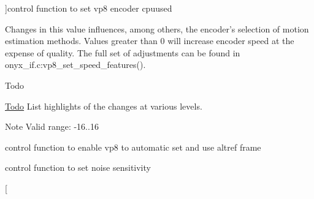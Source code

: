 \begin{Desc}
\begin{description}
{}]control function to set vp8 encoder cpuused \begin{DoxyVerb}   Changes in this value influences, among others, the encoder's selection
   of motion estimation methods. Values greater than 0 will increase encoder
   speed at the expense of quality.
   The full set of adjustments can be found in
   onyx_if.c:vp8_set_speed_features().
\end{DoxyVerb}
 \begin{DoxyRefDesc}{Todo}
\item[\hyperlink{todo__todo000001}{Todo}]List highlights of the changes at various levels.\end{DoxyRefDesc}


\begin{DoxyNote}{Note}
Valid range\-: -\/16..16 
\end{DoxyNote}
\item[{\em 
\hypertarget{group__vp8__encoder_gga6deae3d561c838952552c3d3756322eca24a5530efabb8b4949d01622b1d72cb0}{V\-P8\-E\-\_\-\-S\-E\-T\-\_\-\-E\-N\-A\-B\-L\-E\-A\-U\-T\-O\-A\-L\-T\-R\-E\-F}\label{group__vp8__encoder_gga6deae3d561c838952552c3d3756322eca24a5530efabb8b4949d01622b1d72cb0}
}]control function to enable vp8 to automatic set and use altref frame \item[{\em 
\hypertarget{group__vp8__encoder_gga6deae3d561c838952552c3d3756322eca3fa90cb70bade72af3c2d8d91471a36c}{V\-P8\-E\-\_\-\-S\-E\-T\-\_\-\-N\-O\-I\-S\-E\-\_\-\-S\-E\-N\-S\-I\-T\-I\-V\-I\-T\-Y}\label{group__vp8__encoder_gga6deae3d561c838952552c3d3756322eca3fa90cb70bade72af3c2d8d91471a36c}
}]control function to set noise sensitivity \item[{\em 
}
\end{description}
\end{Desc}
